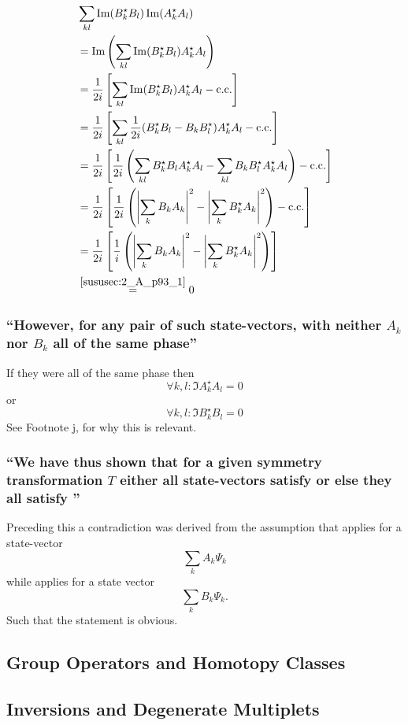 \subsubsection{}
\begin{align*} 
	&\sum\limits_{k l}\Im(B_k^\star B_l) \Im(A_k^\star A_l)\\
	&=\Im\left(\sum\limits_{k l}\Im(B_k^\star B_l) A_k^\star A_l\right)\\
	&=\dfrac{1}{2 i}\left[\sum\limits_{k l}\Im(B_k^\star B_l) A_k^\star A_l- \text{c.c.}\right]\\
	&=\dfrac{1}{2 i}\left[\sum\limits_{k l}\dfrac{1}{2i}(B_k^\star B_l-B_k B_l^\star) A_k^\star A_l- \text{c.c.}\right]\\
	&=\dfrac{1}{2 i}\left[\dfrac{1}{2i}\left(\sum\limits_{k l}B_k^\star B_l A_k^\star A_l- \sum\limits_{k l}B_k B_l^\star A_k^\star A_l\right)- \text{c.c.}\right]\\
	&=\dfrac{1}{2 i}\left[\dfrac{1}{2i}\left(\abs{\sum\limits_{k}B_k A_k}^2-\abs{\sum\limits_{k}B_k^\star A_k}^2\right)- \text{c.c.}\right]\\
	&=\dfrac{1}{2 i}\left[\dfrac{1}{i}\left(\abs{\sum\limits_{k}B_k A_k}^2-\abs{\sum\limits_{k}B_k^\star A_k}^2\right)\right]\\
	&\overset{\ref{sususec:2_A_p93_1}}{=}0
\end{align*}

\subsubsection{\enquote{However, for any pair of such state-vectors, with neither $A_k$ nor $B_k$ \textbf{all of the same phase}} }

If they were all of the same phase then \[\forall k,l: \Im{A_k^\star A_l}=0\]
or \[\forall k,l: \Im{B_k^\star B_l}=0\]
See Footnote j, for why this is relevant.

\subsubsection{\enquote{We have thus shown that for a given symmetry transformation $T$ either all state-vectors satisfy  or else they all satisfy } }
Preceding this a contradiction was derived from the assumption that  applies for a state-vector \[\sum\limits_{k}A_k\Psi_k\] while  applies for a state vector \[\sum\limits_{k}B_k\Psi_k.\]
Such that the statement is obvious.


\subsection{Group Operators and Homotopy Classes}\label{susec:2_B}

\subsection{Inversions and Degenerate Multiplets}\label{susec:2_C}

